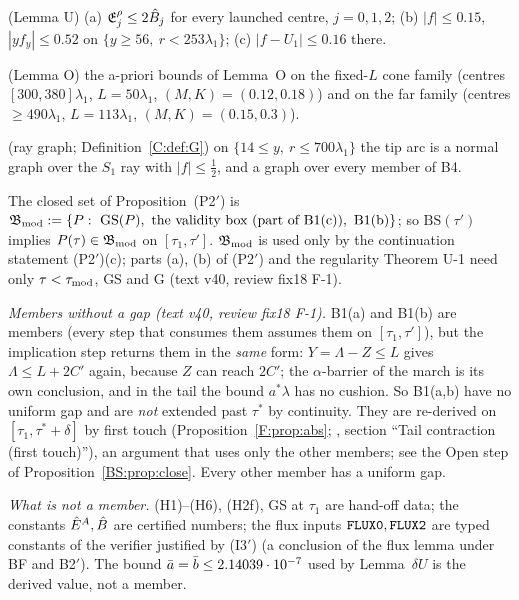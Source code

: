\documentclass[11pt]{article}
\begin{document}
\begin{definition}
\begin{description}[leftmargin=1.3em,itemsep=2pt]
\item[B3U] (Lemma U) (a) $\mathfrak E^\rho_j\le2\hat B_j$ for every launched centre, $j=0,1,2$; (b) $|f|\le0.15$, $|yf_y|\le0.52$ on $\{y\ge56,\ r<253\lambda_1\}$; (c) $|f-U_1|\le0.16$ there.
\item[B4] (Lemma O) the a-priori bounds of Lemma~O on the fixed-$L$ cone family (centres $[300,380]\lambda_1$, $L=50\lambda_1$, $(M,K)=(0.12,0.18)$) and on the far family (centres $\ge490\lambda_1$, $L=113\lambda_1$, $(M,K)=(0.15,0.3)$).
\item[G] (ray graph;  Definition~\ref{C:def:G}) on $\{14\le y,\ r\le700\lambda_1\}$ the tip arc is a normal graph over the $S_1$ ray with $|f|\le\frac12$, and a graph over every member of B4.
\end{description}
The closed set of Proposition~(P2$'$) is $\mathfrak B_{\rm mod}:=\{P:\ \mathrm{GS}(P),\ \text{the validity box (part of B1(c))},\ \text{B1(b)}\}$; so $\mathrm{BS}(\tau')$ implies $P(\tau)\in\mathfrak B_{\rm mod}$ on $[\tau_1,\tau']$. $\mathfrak B_{\rm mod}$ is used only by the continuation statement (P2$'$)(c); parts (a), (b) of (P2$'$) and the regularity Theorem U-1 need only $\tau<\tau_{\rm mod}$, GS and G (text v40, review fix18 F-1).
\end{definition}
\noindent\emph{Members without a gap (text v40, review fix18 F-1).} B1(a) and B1(b) are members (every step that consumes them assumes them on $[\tau_1,\tau']$), but the implication step returns them in the \emph{same} form: $Y=\Lambda-Z\le L$ gives $\Lambda\le L+2C'$ again, because $Z$ can reach $2C'$; the $\alpha$-barrier of the march is its own conclusion, and in the tail the bound $a^*\lambda$ has no cushion. So B1(a,b) have no uniform gap and are \emph{not} extended past $\tau^*$ by continuity. They are re-derived on $[\tau_1,\tau^*+\delta]$ by first touch (Proposition~\ref{F:prop:abs}; , section ``Tail contraction (first touch)''), an argument that uses only the other members; see the Open step of Proposition~\ref{BS:prop:close}. Every other member has a uniform gap.

\noindent\emph{What is not a member.} (H1)--(H6), (H2f), GS at $\tau_1$ are hand-off data; the constants $\hat E^A,\hat B$ are certified numbers; the flux inputs $\fn{FLUX0},\fn{FLUX2}$ are typed constants of the verifier justified by (I3$'$) (a conclusion of the flux lemma under BF and B2$'$). The bound $\bar a=\bar b\le2.14039\cdot10^{-7}$ used by Lemma~$\delta U$ is the derived value, not a member.
\end{document}
